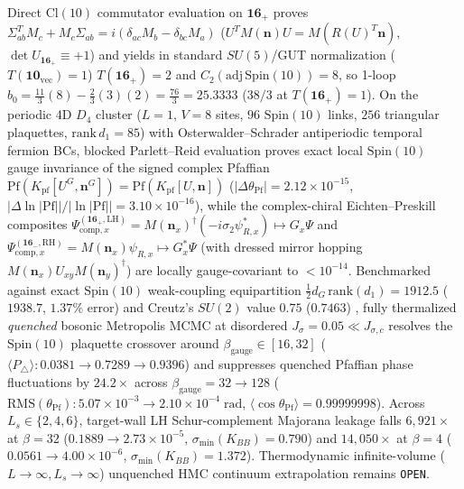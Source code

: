 \documentclass[11pt,a4paper]{article}
\begin{document}
\begin{enumerate}
    Direct $\mathrm{Cl}(10)$ commutator evaluation on $\mathbf{16}_+$ proves $\Sigma_{ab}^T M_c + M_c\Sigma_{ab} = i(\delta_{ac}M_b - \delta_{bc}M_a)$ ($U^T M(\mathbf{n})U = M(R(U)^T\mathbf{n})$, $\det U_{\mathbf{16}_+}\equiv +1$) and yields in standard $SU(5)$/GUT normalization ($T(\mathbf{10}_{\mathrm{vec}})=1$) $T(\mathbf{16}_+)=2$ and $C_2(\mathrm{adj}\,\mathrm{Spin}(10))=8$, so 1-loop $b_0 = \frac{11}{3}(8)-\frac{2}{3}(3)(2) = \frac{76}{3} = 25.3333$ ($38/3$ at $T(\mathbf{16}_+)=1$). On the periodic 4D $D_4$ cluster ($L=1$, $V=8$ sites, $96$ $\mathrm{Spin}(10)$ links, $256$ triangular plaquettes, $\mathrm{rank}\,d_1 = 85$) with Osterwalder--Schrader antiperiodic temporal fermion BCs, blocked Parlett--Reid evaluation \cite{Wimmer2012} proves exact local $\mathrm{Spin}(10)$ gauge invariance of the signed complex Pfaffian $\mathrm{Pf}(K_{\mathrm{pf}}[U^G,\mathbf{n}^G]) = \mathrm{Pf}(K_{\mathrm{pf}}[U,\mathbf{n}])$ ($|\Delta\theta_{\mathrm{Pf}}|=2.12\times 10^{-15}$, $|\Delta\ln|\mathrm{Pf}||/|\ln|\mathrm{Pf}||=3.10\times 10^{-16}$), while the complex-chiral Eichten--Preskill composites $\Psi_{\mathrm{comp},x}^{(\mathbf{16}_+,\mathrm{LH})} = M(\mathbf{n}_x)^\dagger(-i\sigma_2\psi_{R,x}^*)\mapsto G_x\Psi$ and $\Psi_{\mathrm{comp},x}^{(\mathbf{16}_-,\mathrm{RH})} = M(\mathbf{n}_x)\psi_{R,x}\mapsto G_x^*\Psi$ (with dressed mirror hopping $M(\mathbf{n}_x)U_{xy}M(\mathbf{n}_y)^\dagger$) are locally gauge-covariant to $<10^{-14}$. Benchmarked against exact $\mathrm{Spin}(10)$ weak-coupling equipartition $\frac{1}{2}d_G\,\mathrm{rank}(d_1)=1912.5$ ($1938.7$, $1.37\%$ error) and Creutz's $SU(2)$ value $0.75$ ($0.7463$) \cite{Creutz1983}, fully thermalized \emph{quenched} bosonic Metropolis MCMC at disordered $J_\sigma=0.05\ll J_{\sigma,c}$ resolves the $\mathrm{Spin}(10)$ plaquette crossover around $\beta_{\mathrm{gauge}}\in[16,32]$ ($\langle P_\triangle\rangle: 0.0381\to 0.7289\to 0.9396$) and suppresses quenched Pfaffian phase fluctuations by $24.2\times$ across $\beta_{\mathrm{gauge}}=32\to 128$ ($\mathrm{RMS}(\theta_{\mathrm{Pf}}): 5.07\times 10^{-3}\to 2.10\times 10^{-4}\;\mathrm{rad}$, $\langle\cos\theta_{\mathrm{Pf}}\rangle=0.99999998$). Across $L_s\in\{2,4,6\}$, target-wall LH Schur-complement Majorana leakage falls $6{,}921\times$ at $\beta=32$ ($0.1889\to 2.73\times 10^{-5}$, $\sigma_{\min}(K_{BB})=0.790$) and $14{,}050\times$ at $\beta=4$ ($0.0561\to 4.00\times 10^{-6}$, $\sigma_{\min}(K_{BB})=1.372$). Thermodynamic infinite-volume ($L\to\infty, L_s\to\infty$) unquenched HMC continuum extrapolation remains \texttt{OPEN}.
\end{enumerate}
\end{document}
